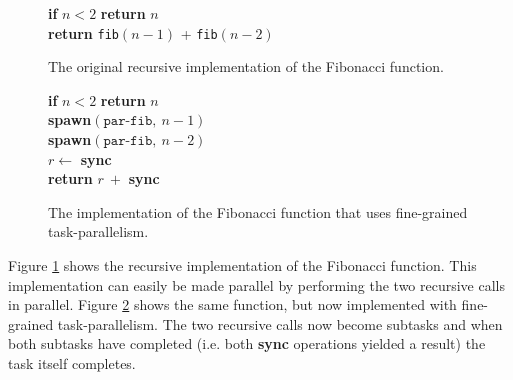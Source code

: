\begin{figure}
	\centering
	\begin{algorithm}[H]
		\SetStartEndCondition{ }{}{}%
		\AlgoDontDisplayBlockMarkers\SetAlgoNoEnd\SetAlgoNoLine%

		 {
			\textbf{if} $n < 2$ \textbf{return} $n$ \\
			\textbf{return} \texttt{fib}$(n-1)$ + \texttt{fib}$(n-2)$
		}
	\end{algorithm}

	\caption{The original recursive implementation of the Fibonacci function.}
	\label{fig:fib_seq}
\end{figure}

\begin{figure}
	\centering
	\begin{algorithm}[H]
		\SetStartEndCondition{ }{}{}%
		\AlgoDontDisplayBlockMarkers\SetAlgoNoEnd\SetAlgoNoLine%

		 {
			\textbf{if} $n < 2$ \textbf{return} $n$ \\
			\textbf{spawn}$(\texttt{par-fib}, \ n - 1)$ \\
			\textbf{spawn}$(\texttt{par-fib}, \ n - 2)$ \\
			$r \gets$ \textbf{sync} \\
			\textbf{return} $r \ + $ \textbf{sync}
		}
	\end{algorithm}

	\caption{The implementation of the Fibonacci function that uses fine-grained task-parallelism.}
	\label{fig:fib_par}
\end{figure}

Figure \ref{fig:fib_seq} shows the recursive implementation of the Fibonacci function. This implementation can easily be made parallel by performing the two recursive calls in parallel. Figure \ref{fig:fib_par} shows the same function, but now implemented with fine-grained task-parallelism. The two recursive calls now become subtasks and when both subtasks have completed (i.e. both \textbf{sync} operations yielded a result) the task itself completes. 

